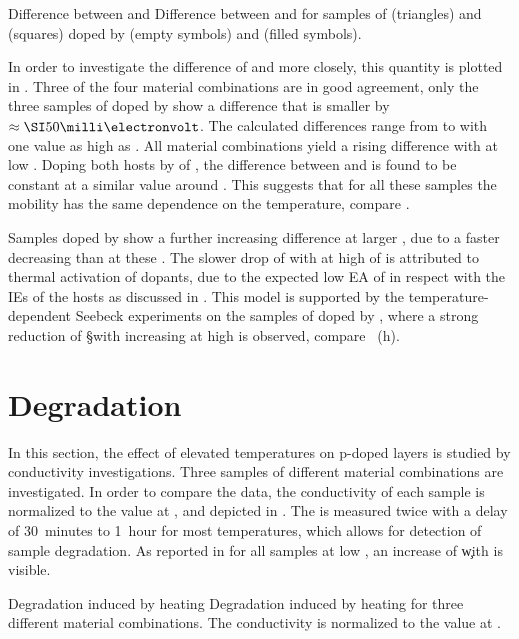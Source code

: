 %
{Difference between \Eact and \Es}
{Difference between \EactLongL and \EsLongL for samples of \meo (triangles) and \lili (squares) doped by \FS (empty symbols) and \CSF (filled symbols).
}

In order to investigate the difference of \Es and \Eact more closely, this quantity is plotted in .
Three of the four material combinations are in good agreement, only the three samples of \lili doped by \CSF show a difference that is smaller by $\approx\meV{50}$. The calculated differences range from  to  with one value as high as .
All material combinations yield a rising difference with \C at low \C.
Doping both hosts by  of \FS, the difference between \Es and \Eact is found to be constant at a similar value around . This suggests that for all these samples the mobility has the same dependence on the temperature, compare .

Samples doped by \CSF show a further increasing difference at larger \C, due to a faster decreasing \Es than \Eact at these \CLongs.
The slower drop of \Eact with \C at high \C of \CSF is attributed to thermal activation of dopants, due to the expected low EA of \CSF in respect with the IEs of the hosts as discussed in . This model is supported by the temperature-dependent Seebeck experiments on the samples of \lili doped by \CSF, where a strong reduction of \S with increasing \T at high \C is observed, compare ~(h).

\section{Degradation}\label{sec:ResP-Degradation}
%

In this section, the effect of elevated temperatures on p-doped layers is studied by conductivity investigations. Three samples of different material combinations are investigated. In order to compare the data, the conductivity of each sample is normalized to the value at \T[25], and depicted in . The \cLong is measured twice with a delay of 30~minutes to 1~hour for most temperatures, which allows for detection of sample degradation. As reported in  for all samples at low \T, an increase of \c with \T is visible.

{Degradation induced by heating}
{Degradation induced by heating for three different material combinations. The conductivity is normalized to the value at \T[25].}

